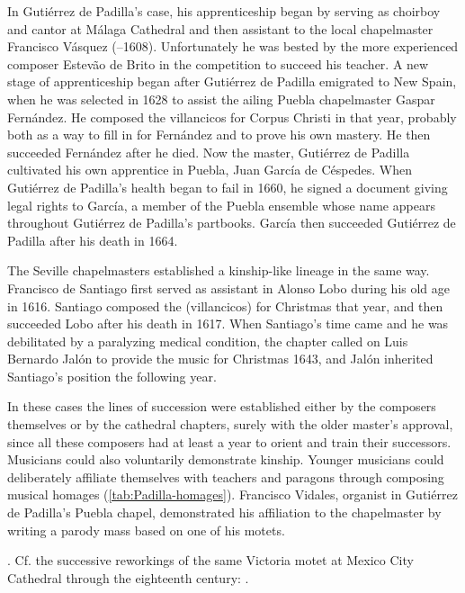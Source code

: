 In Gutiérrez de Padilla's case, his apprenticeship began by serving as choirboy
and cantor at Málaga Cathedral and then assistant to the local chapelmaster
Francisco Vásquez (--1608).
Unfortunately he was bested by the more experienced composer Estevão de Brito
in the competition to succeed his teacher.%
    \Autocites
    {Gembero:Padilla}
    {Stevenson:BritoE}
A new stage of apprenticeship began after Gutiérrez de Padilla emigrated to New
Spain, when he was selected in 1628 to assist the ailing Puebla chapelmaster
Gaspar Fernández.%
    \Autocite{Morales:Fernandez}
He composed the villancicos for Corpus Christi in that year, probably both as a
way to fill in for Fernández and to prove his own mastery.%
    \Autocite{Cashner:Cards}
He then succeeded Fernández after he died.
Now the master, Gutiérrez de Padilla cultivated his own apprentice in Puebla,
Juan García de Céspedes.
When Gutiérrez de Padilla's health began to fail in 1660, he signed a
 document giving legal rights to García, a member of
the Puebla ensemble whose name appears throughout Gutiérrez de Padilla's
partbooks.  
García then succeeded Gutiérrez de Padilla after his death in 1664.%
    \Autocite[237--238]{Mauleon:PadillaCivil}

The Seville chapelmasters established a kinship-like lineage in the same way.
Francisco de Santiago first served as assistant in Alonso Lobo during his old
age in 1616.%
    \Autocites
    {Stevenson:SantiagoF}
    {Perez:DMEH-Santiago}
Santiago composed the  (villancicos) for Christmas that year,
and then succeeded Lobo after his death in 1617.
When Santiago's time came and he was debilitated by a paralyzing medical
condition, the chapter called on Luis Bernardo Jalón to provide the music for
Christmas 1643, and Jalón inherited Santiago's position the following year.

In these cases the lines of succession were established either by the composers
themselves or by the cathedral chapters, surely with the older master's
approval, since all these composers had at least a year to orient and train
their successors.
Musicians could also voluntarily demonstrate kinship.
Younger musicians could deliberately affiliate themselves with teachers and
paragons through composing musical homages (\cref{tab:Padilla-homages}).
Francisco Vidales, organist in Gutiérrez de Padilla's Puebla chapel,
demonstrated his affiliation to the chapelmaster by writing a parody mass
based on one of his motets.%
\begin{Footnote}
    \Autocite{Koegel:Padilla}.    
    Cf. the successive reworkings of the same Victoria motet at
    Mexico City Cathedral through the eighteenth century:
    \autocite{Goldman:StileAntico}.
\end{Footnote}

